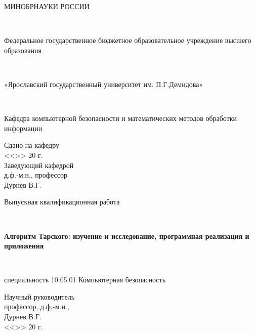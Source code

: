 \begin{titlepage}
    \begin{center}
        {\large МИНОБРНАУКИ РОССИИ
            
        ~
        
        Федеральное государственное бюджетное образовательное учреждение высшего образования		
        
        ~
        
        «Ярославский государственный университет им. П.Г.Демидова»
        
        ~
        
        Кафедра компьютерной безопасности и математических методов обработки информации}
        \vfill
        \newlength{\ML}
        \hfill\begin{minipage}{0.45\textwidth}
            \begin{flushright}
                Сдано на кафедру\\ 
                <<\underline{\hspace{1cm}}>> \underline{\hspace{2cm}} 20\underline{\hspace{1cm}} г.\\
                Заведующий кафедрой \\
                д.ф.-м.н., профессор\\
                \underline{\hspace{3cm}} Дурнев В.Г.\\
            \end{flushright}
        \end{minipage}%
        \vfill
        
        {\large Выпускная квалификационная работа}
        
        ~
        
        \textbf{{\large Алгоритм Тарского: изучение и исследование, программная реализация и приложения}}

        ~

        \large{специальность  10.05.01 Компьютерная безопасность}

    \end{center}
    \vfill
    
    
    \hfill\begin{minipage}{0.45\textwidth}
        \begin{flushright}
            Научный руководитель\\
            профессор, д.ф.-м.н.,\\
            \underline{\hspace{3cm}} Дурнев В.Г.\\
            <<\underline{\hspace{1cm}}>> \underline{\hspace{2cm}} 20\underline{\hspace{1cm}} г.
        \end{flushright}
        

\end{minipage}
\end{titlepage}
